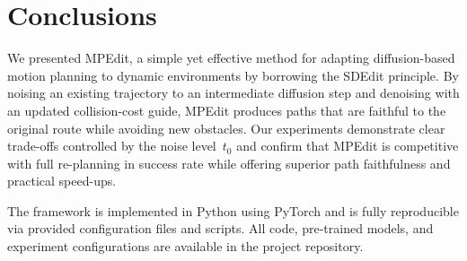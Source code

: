 \documentclass[12pt]{article}
\begin{document}
\section{Conclusions}
\label{sec:conclusions}

We presented MPEdit, a simple yet effective method for adapting
diffusion-based motion planning to dynamic environments by borrowing the
SDEdit principle.  By noising an existing trajectory to an intermediate
diffusion step and denoising with an updated collision-cost guide, MPEdit
produces paths that are faithful to the original route while avoiding new
obstacles.  Our experiments demonstrate clear trade-offs controlled by the
noise level~$t_0$ and confirm that MPEdit is competitive with full
re-planning in success rate while offering superior path faithfulness and
practical speed-ups.

The framework is implemented in Python using PyTorch and is fully
reproducible via provided configuration files and scripts.  All code,
pre-trained models, and experiment configurations are available in the
project repository.



\end{document}
